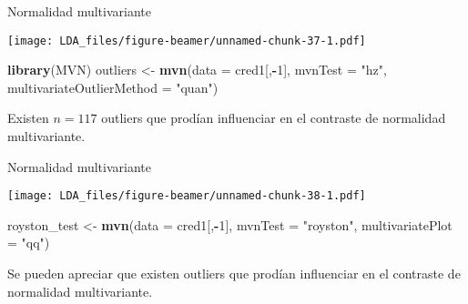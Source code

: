 \documentclass[ignorenonframetext,]{beamer}
\newenvironment{Shaded}{\begin{snugshade}}{\end{snugshade}}
\newcommand{\KeywordTok}[1]{\textcolor[rgb]{0.13,0.29,0.53}{\textbf{#1}}}
\newcommand{\DataTypeTok}[1]{\textcolor[rgb]{0.13,0.29,0.53}{#1}}
\newcommand{\DecValTok}[1]{\textcolor[rgb]{0.00,0.00,0.81}{#1}}
\newcommand{\StringTok}[1]{\textcolor[rgb]{0.31,0.60,0.02}{#1}}
\newcommand{\OperatorTok}[1]{\textcolor[rgb]{0.81,0.36,0.00}{\textbf{#1}}}
\newcommand{\NormalTok}[1]{#1}
\begin{document}
\begin{frame}[fragile]{Normalidad multivariante}

\hypertarget{left}{}
\texttt{[image: LDA\_files/figure-beamer/unnamed-chunk-37-1.pdf]}

\hypertarget{right}{}
\begin{Shaded}
\begin{Highlighting}[]
\KeywordTok{library}\NormalTok{(MVN)}
\NormalTok{outliers <-}\StringTok{ }\KeywordTok{mvn}\NormalTok{(}\DataTypeTok{data =}\NormalTok{ cred1[,}\OperatorTok{-}\DecValTok{1}\NormalTok{], }\DataTypeTok{mvnTest =} \StringTok{"hz"}\NormalTok{, }\DataTypeTok{multivariateOutlierMethod =} \StringTok{"quan"}\NormalTok{)}
\end{Highlighting}
\end{Shaded}

Existen \(n=117\) outliers que prodían influenciar en el contraste de
normalidad multivariante.

\end{frame}

\begin{frame}[fragile]{Normalidad multivariante}

\hypertarget{left}{}
\texttt{[image: LDA\_files/figure-beamer/unnamed-chunk-38-1.pdf]}

\hypertarget{right}{}
\begin{Shaded}
\begin{Highlighting}[]
\NormalTok{royston_test <-}\StringTok{ }\KeywordTok{mvn}\NormalTok{(}\DataTypeTok{data =}\NormalTok{ cred1[,}\OperatorTok{-}\DecValTok{1}\NormalTok{], }\DataTypeTok{mvnTest =} \StringTok{"royston"}\NormalTok{, }\DataTypeTok{multivariatePlot =} \StringTok{"qq"}\NormalTok{)}
\end{Highlighting}
\end{Shaded}

Se pueden apreciar que existen outliers que prodían influenciar en el
contraste de normalidad multivariante.

\end{frame}
\end{document}
